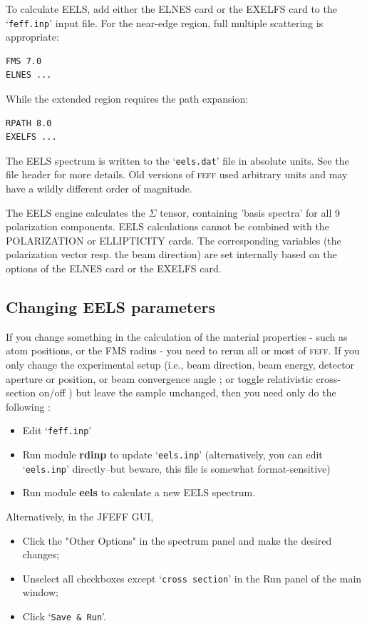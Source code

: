 \documentclass[11pt,oneside]{report} %
\renewcommand{\htmlref}[2]{\hyperlink{#2}{#1}}
\newcommand{\program}[1]{\textsc{#1}}
\newcommand{\feff}{\program{feff}}
\newcommand{\file}[1]{`\texttt{#1}'}
\newcommand{\module}[1]{\textrm{\bf{#1}}}
\renewcommand{\htmlref}[2]{{#1}} %
\begin{document}
To calculate EELS, add either the \htmlref{ELNES}{card:eln} card or the \htmlref{EXELFS}{card:exe} card to the \file{feff.inp} input file.  For the near-edge region, full multiple scattering is appropriate:
\begin{verbatim}
FMS 7.0
ELNES ...
\end{verbatim}
While the extended region requires the path expansion:
\begin{verbatim}
RPATH 8.0
EXELFS ...
\end{verbatim}

The EELS spectrum is written to the \file{eels.dat} file in absolute units.  See the file header for more details.  Old versions of {\feff} used arbitrary units and may have a wildly different order of magnitude.

  The EELS engine calculates the $\Sigma$ tensor, containing 'basis spectra' for 
all 9 polarization components.  EELS calculations cannot be combined with the \htmlref{POLARIZATION}{card:pol} or \htmlref{ELLIPTICITY}{card:ell} cards.  The
corresponding variables (the polarization vector resp. the beam direction) are set internally based on the options of the \htmlref{ELNES}{card:eln} card or the \htmlref{EXELFS}{card:exe} card.



\subsection{Changing EELS parameters}
\label{sec:EELS-changing}
If you change something in the calculation of the material properties - such as atom 
positions, or the FMS radius - you need to rerun all or most of {\feff}.
If you only change the experimental setup  (i.e., beam direction, beam energy, detector aperture or position, or beam convergence angle ; or toggle relativistic cross-section on/off ) but leave the sample unchanged, then you need only do the following :

\begin{itemize} \tightlist
  \item Edit \file{feff.inp}
  \item Run module \module{rdinp} to update \file{eels.inp} (alternatively, you can edit 
    \file{eels.inp} directly--but beware, this file is somewhat format-sensitive)
  \item Run module \module{eels} to calculate a new EELS spectrum.
\end{itemize}

Alternatively, in the JFEFF GUI,
\begin{itemize} \tightlist
\item Click the "Other Options" in the spectrum panel and make the desired changes; 
\item Unselect all checkboxes except \file{cross section} in the Run panel of the main window;
\item Click \file{Save \& Run}.
\end{itemize}
\end{document}
